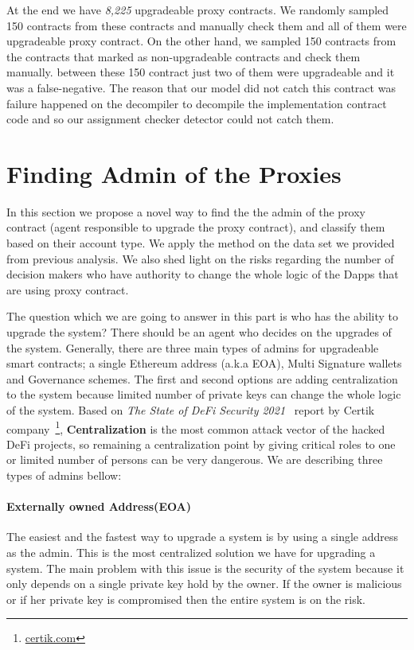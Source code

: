At the end we have \textit{8,225} upgradeable proxy contracts. We randomly sampled 150 contracts from these contracts and manually check them and all of them were upgradeable proxy contract. On the other hand, we sampled 150 contracts from the contracts that marked as non-upgradeable contracts and check them manually. between these 150 contract just two of them were upgradeable and it was a false-negative. The reason that our model did not catch this contract was failure happened on the decompiler to decompile the implementation contract code and so our assignment checker detector could not catch them. 


\section{Finding Admin of the Proxies}

In this section we propose a novel way to find the the admin of the proxy contract (agent responsible to upgrade the proxy contract), and classify them based on their account type. We apply the method on the data set we provided from previous analysis. We also shed light on the risks regarding the number of decision makers who have authority to change the whole logic of the Dapps that are using proxy contract.

The question which we are going to answer in this part is who has the ability to upgrade the system? There should be an agent who decides on the upgrades of the system. Generally, there are three main types of admins for upgradeable smart contracts; a single Ethereum address (a.k.a EOA), Multi Signature wallets and Governance schemes. The first and second options are adding centralization to the system because limited number of private keys can change the whole logic of the system. Based on \textit{The State of DeFi Security 2021}~\cite{certikReport} report by Certik company~\footnote{\url{certik.com}}, \textbf{Centralization} is the most common attack vector of the hacked DeFi projects, so remaining a centralization point by giving critical roles to one or limited number of persons can be very dangerous.
We are describing three types of admins bellow:

\paragraph{Externally owned Address(EOA)}
The easiest and the fastest way to upgrade a system is by using a single address as the admin. This is the most centralized solution we have for upgrading a system. The main problem with this issue is the security of the system because it only depends on a single private key hold by the owner. If the owner is malicious or if her private key is compromised then the entire system is on the risk.

